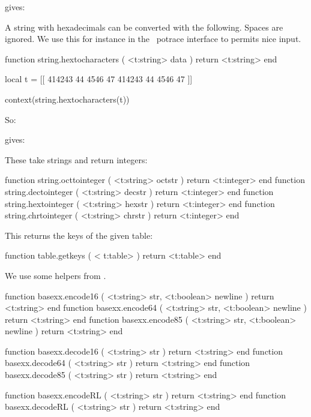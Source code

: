 gives: \inlinebuffer

A string with hexadecimals can be converted with the following. Spaces are
ignored. We use this for instance in the \METAPOST\ potrace interface to
permits nice input.

\starttyping[option=LUA]
function string.hextocharacters ( <t:string> data )
    return <t:string>
end
\stoptyping

\startbuffer
\startluacode
local t = [[
  414243 44 4546 47
  414243 44 4546 47
]]

context(string.hextocharacters(t))
\stopluacode
\stopbuffer

So:

\typebuffer

gives: \inlinebuffer

These take strings and return integers:

\starttyping[option=LUA]
function string.octtointeger ( <t:string> octstr ) return <t:integer> end
function string.dectointeger ( <t:string> decstr ) return <t:integer> end
function string.hextointeger ( <t:string> hexstr ) return <t:integer> end
function string.chrtointeger ( <t:string> chrstr ) return <t:integer> end
\stoptyping

\stopsubsection

\startsubsection[title=Extra table helpers]

This returns the keys of the given table:

\starttyping[option=LUA]
function table.getkeys ( < t:table> )
    return <t:table>
end
\stoptyping

\stopsubsection

\startsubsection[title=Byte encoding and decoding]

We use some helpers from .

\starttyping[option=LUA]
function basexx.encode16  ( <t:string> str, <t:boolean> newline )
    return <t:string>
end
function basexx.encode64  ( <t:string> str, <t:boolean> newline )
    return <t:string>
end
function basexx.encode85  ( <t:string> str, <t:boolean> newline )
    return <t:string>
end

function basexx.decode16  ( <t:string> str ) return <t:string> end
function basexx.decode64  ( <t:string> str ) return <t:string> end
function basexx.decode85  ( <t:string> str ) return <t:string> end

function basexx.encodeRL  ( <t:string> str ) return <t:string> end
function basexx.decodeRL  ( <t:string> str ) return <t:string> end

